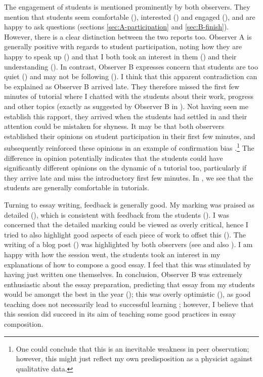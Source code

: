 The engagement of students is mentioned prominently by both observers. They mention that students seem comfortable (), interested () and engaged (), and are happy to ask questions (sections \ref{sec:A-participation} and \ref{sec:B-finish}). However, there is a clear distinction between the two reports too. Observer A is generally positive with regards to student participation, noting how they are happy to speak up () and that I both took an interest in them () and their understanding (). In contrast, Observer B expresses concern that students are too quiet () and may not be following (). I think that this apparent contradiction can be explained as Observer B arrived late. They therefore missed the first few minutes of tutorial where I chatted with the students about their work, progress and other topics (exactly as suggested by Observer B in ). Not having seen me establish this rapport, they arrived when the students had settled in and their attention could be mistaken for shyness. It may be that both observers established their opinions on student participation in their first few minutes, and subsequently reinforced these opinions in an example of confirmation bias \citep{Ross1975,Lord1979}.\footnote{One could conclude that this is an inevitable weakness in peer observation; however, this might just reflect my own predisposition as a physicist against qualitative data.} The difference in opinion potentially indicates that the students could have significantly different opinions on the dynamic of a tutorial too, particularly if they arrive late and miss the introductory first few minutes. In , we see that the students are generally comfortable in tutorials.

Turning to essay writing, feedback is generally good. My marking was praised as detailed (), which is consistent with feedback from the students (). I was concerned that the detailed marking could be viewed as overly critical, hence I tried to also highlight good aspects of each piece of work to offset this  (). The writing of a blog post () was highlighted by both observers (see  and also ). I am happy with how the session went, the students took an interest in my explanations of how to compose a good essay. I feel that this was stimulated by having just written one themselves. In conclusion, Observer B was extremely enthusiastic about the essay preparation, predicting that essay from my students would be amongst the best in the year (); this was overly optimistic (), as good teaching does not necessarily lead to successful learning \citep[chapter 5]{Ramsden1992}; however, I believe that this session did succeed in its aim of teaching some good practices in essay composition.


